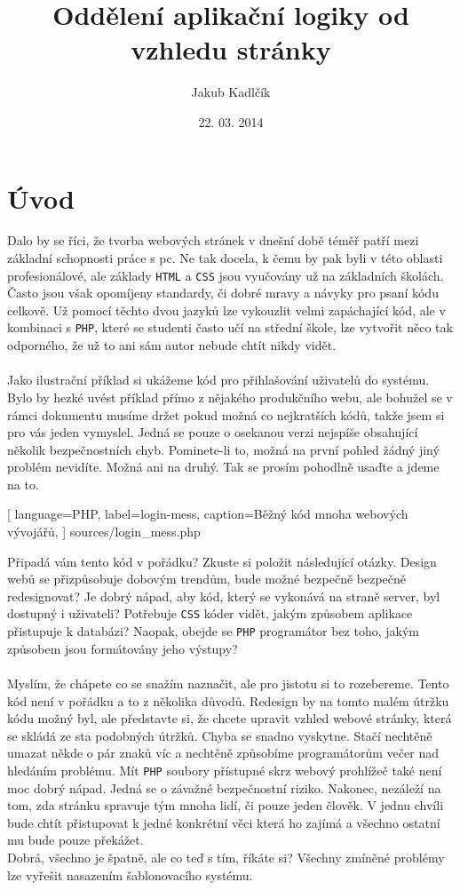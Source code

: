 \documentclass[10pt,a4paper]{article}
\title{Oddělení aplikační logiky od vzhledu stránky}
\author{Jakub Kadlčík}
\date{22. 03. 2014}
\begin{document}
	\maketitle
	\newpage
	
	\tableofcontents
	\newpage
	
	\section{Úvod}
	\label{uvod}
	Dalo by se říci, že tvorba webových stránek v dnešní době téměř patří mezi základní schopnosti práce s pc. Ne tak docela, k čemu by pak byli v této oblasti profesionálové, ale základy \texttt{HTML} a \texttt{CSS} jsou vyučovány už na základních školách. Často jsou však opomíjeny standardy, či dobré mravy a návyky pro psaní kódu celkově. Už pomocí těchto dvou jazyků lze vykouzlit velmi zapáchající kód, ale v kombinaci s \texttt{PHP}, které se studenti často učí na střední škole, lze vytvořit něco tak odporného, že už to ani sám autor nebude chtít nikdy vidět.
	\\
	\\
	Jako ilustrační příklad si ukážeme kód pro přihlašování uživatelů do systému. Bylo by hezké uvést příklad přímo z nějakého produkčního webu, ale bohužel se v rámci dokumentu musíme držet pokud možná co nejkratších kódů, takže jsem si pro vás jeden vymyslel. Jedná se pouze o osekanou verzi nejspíše obsahující několik bezpečnostních chyb. Pominete-li to, možná na první pohled žádný jiný problém nevidíte. Možná ani na druhý. Tak se prosím pohodlně usaďte a jdeme na to.
	
	
	[
		language=PHP,
		label=login-mess,
		caption={Běžný kód mnoha webových vývojářů},
	] {sources/login_mess.php}
	
	Připadá vám tento kód v pořádku? Zkuste si položit následující otázky. Design webů se přizpůsobuje dobovým trendům, bude možné bezpečně bezpečně redesignovat? Je dobrý nápad, aby kód, který se vykonává na straně server, byl dostupný i uživateli? Potřebuje \texttt{CSS} kóder vidět, jakým způsobem aplikace přistupuje k databázi? Naopak, obejde se \texttt{PHP} programátor bez toho, jakým způsobem jsou formátovány jeho výstupy?
	\\
	\\
	Myslím, že chápete co se snažím naznačit, ale pro jistotu si to rozebereme. Tento kód není v pořádku a to z několika důvodů. Redesign by na tomto malém útržku kódu možný byl, ale představte si, že chcete upravit vzhled webové stránky, která se skládá ze sta podobných útržků. Chyba se snadno vyskytne. Stačí nechtěně umazat někde o pár znaků víc a nechtěně způsobíme programátorům  večer nad hledáním problému. Mít \texttt{PHP} soubory přístupné skrz webový prohlížeč také není moc dobrý nápad. Jedná se o závažné bezpečnostní riziko. Nakonec, nezáleží na tom, zda stránku spravuje tým mnoha lidí, či pouze jeden člověk. V jednu chvíli bude chtít přistupovat k jedné konkrétní věci která ho zajímá a všechno ostatní mu bude pouze překážet.
	\\ Dobrá, všechno je špatně, ale co teď s tím, říkáte si? Všechny zmíněné problémy lze vyřešit nasazením šablonovacího systému.
\end{document}
